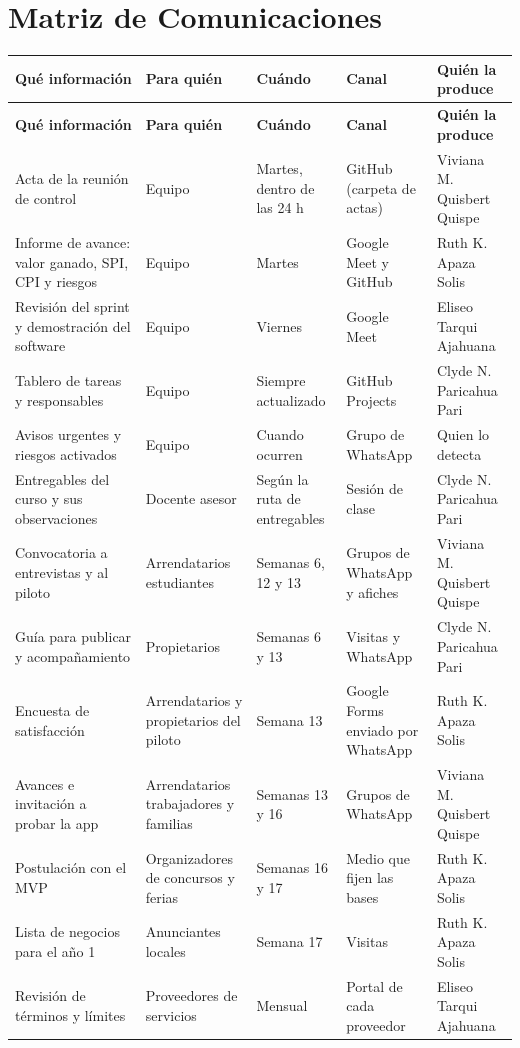 \documentclass[11pt,a4paper]{article}
\begin{document}
\section{Matriz de Comunicaciones}
{\footnotesize
\setlength{\tabcolsep}{3.5pt}
\begin{longtable}{@{}>{\raggedright\arraybackslash}p{4.0cm} >{\raggedright\arraybackslash}p{2.9cm} >{\raggedright\arraybackslash}p{2.4cm} >{\raggedright\arraybackslash}p{2.9cm} >{\raggedright\arraybackslash}p{2.7cm}@{}}
\toprule
\rowcolor{AzulClaro}
\textbf{Qué información} & \textbf{Para quién} & \textbf{Cuándo} & \textbf{Canal} & \textbf{Quién la produce} \\
\midrule
\endfirsthead
\toprule
\rowcolor{AzulClaro}
\textbf{Qué información} & \textbf{Para quién} & \textbf{Cuándo} & \textbf{Canal} & \textbf{Quién la produce} \\
\midrule
\endhead
\bottomrule
\endfoot
Acta de la reunión de control & Equipo & Martes, dentro de las 24 h & GitHub (carpeta de actas) & Viviana M. Quisbert Quispe \\
\rowcolor{GrisFila}
Informe de avance: valor ganado, SPI, CPI y riesgos & Equipo & Martes & Google Meet y GitHub & Ruth K. Apaza Solis \\
Revisión del sprint y demostración del software & Equipo & Viernes & Google Meet & Eliseo Tarqui Ajahuana \\
\rowcolor{GrisFila}
Tablero de tareas y responsables & Equipo & Siempre actualizado & GitHub Projects & Clyde N. Paricahua Pari \\
Avisos urgentes y riesgos activados & Equipo & Cuando ocurren & Grupo de WhatsApp & Quien lo detecta \\
\rowcolor{GrisFila}
Entregables del curso y sus observaciones & Docente asesor & Según la ruta de entregables & Sesión de clase & Clyde N. Paricahua Pari \\
Convocatoria a entrevistas y al piloto & Arrendatarios estudiantes & Semanas 6, 12 y 13 & Grupos de WhatsApp y afiches & Viviana M. Quisbert Quispe \\
\rowcolor{GrisFila}
Guía para publicar y acompañamiento & Propietarios & Semanas 6 y 13 & Visitas y WhatsApp & Clyde N. Paricahua Pari \\
Encuesta de satisfacción & Arrendatarios y propietarios del piloto & Semana 13 & Google Forms enviado por WhatsApp & Ruth K. Apaza Solis \\
\rowcolor{GrisFila}
Avances e invitación a probar la app & Arrendatarios trabajadores y familias & Semanas 13 y 16 & Grupos de WhatsApp & Viviana M. Quisbert Quispe \\
Postulación con el MVP & Organizadores de concursos y ferias & Semanas 16 y 17 & Medio que fijen las bases & Ruth K. Apaza Solis \\
\rowcolor{GrisFila}
Lista de negocios para el año 1 & Anunciantes locales & Semana 17 & Visitas & Ruth K. Apaza Solis \\
Revisión de términos y límites & Proveedores de servicios & Mensual & Portal de cada proveedor & Eliseo Tarqui Ajahuana \\
\end{longtable}
}
\end{document}
